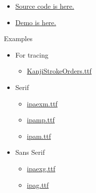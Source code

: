 \documentclass[letterpaper]{article}
\begin{document}
	\begin{itemize}
		
			\item[] {\Large 
			 \href{https://github.com/gwmatthews/TheFourVows}{Source code is here.}}
			 \item[] {\Large 
			 	\href{https://gwmatthews.github.io/the-four-vows.pdf}{Demo is here.}}
		
	\end{itemize}
	
	
	\vfill\eject\pagebreak
	
	\vspace*{2cm}
	
	{\LARGE Examples}
	
	\vspace*{1cm}
	
	
	
	\begin{itemize}
		\item[] {\LARGE For tracing}
		\begin{itemize}
			\item[] \href{https://gwmatthews.github.io/the-four-vows-stroke-order.pdf}{KanjiStrokeOrders.ttf}
		\end{itemize}
	\end{itemize}
	
	\vspace*{1cm}
	
	\begin{itemize}
		\item[] {\LARGE Serif}
		\begin{itemize}
			\item[] \href{https://gwmatthews.github.io/the-four-vows-ipaexm.pdf}{ipaexm.ttf}
			\item[] \href{https://gwmatthews.github.io/the-four-vows-ipamp.pdf}{ipamp.ttf}
			\item[] 
			\href{https://gwmatthews.github.io/the-four-vows-ipam.pdf}{ipam.ttf}
		\end{itemize}
	\end{itemize}
	
	\vspace*{1cm}
	
	\begin{itemize}
		\item[] {\LARGE Sans Serif}
		\begin{itemize}
			\item[] \href{https://gwmatthews.github.io/the-four-vows-ipaexg.pdf}{ipaexg.ttf}
			\item[] 
			\href{https://gwmatthews.github.io/the-four-vows-ipag.pdf}{ipag.ttf}
		\end{itemize}
	\end{itemize}
\end{document}
